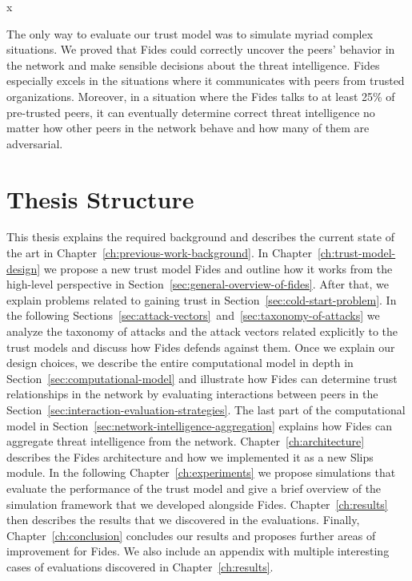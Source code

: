 x

The only way to evaluate our trust model was to simulate myriad complex situations. We proved that Fides could correctly uncover the peers' behavior in the network and make sensible decisions about the threat intelligence. 
Fides especially excels in the situations where it communicates with peers from trusted organizations.
Moreover, in a situation where the Fides talks to at least 25\% of pre-trusted peers, it can eventually determine correct threat intelligence no matter how other peers in the network behave and how many of them are adversarial.

\section{Thesis Structure}
\label{sec:thesis-structure}
This thesis explains the required background and describes the current state of the art in Chapter~\ref{ch:previous-work-background}.
In Chapter~\ref{ch:trust-model-design} we propose a new trust model Fides and outline how it works from the high-level perspective in Section~\ref{sec:general-overview-of-fides}.
After that, we explain problems related to gaining trust in Section~\ref{sec:cold-start-problem}.
In the following Sections~\ref{sec:attack-vectors}~and~\ref{sec:taxonomy-of-attacks} we analyze the taxonomy of attacks and the attack vectors related explicitly to the trust models and discuss how Fides defends against them.
Once we explain our design choices, we describe the entire computational model in depth in Section~\ref{sec:computational-model} and illustrate how Fides can determine trust relationships in the network by evaluating interactions between peers in the Section~\ref{sec:interaction-evaluation-strategies}.
The last part of the computational model in Section~\ref{sec:network-intelligence-aggregation} explains how Fides can aggregate threat intelligence from the network.
Chapter~\ref{ch:architecture} describes the Fides architecture and how we implemented it as a new Slips module.
In the following Chapter~\ref{ch:experiments} we propose simulations that evaluate the performance of the trust model and give a brief overview of the simulation framework that we developed alongside Fides.
Chapter~\ref{ch:results} then describes the results that we discovered in the evaluations. Finally, Chapter~\ref{ch:conclusion} concludes our results and proposes further areas of improvement for Fides. 
We also include an appendix with multiple interesting cases of evaluations discovered in Chapter~\ref{ch:results}.

